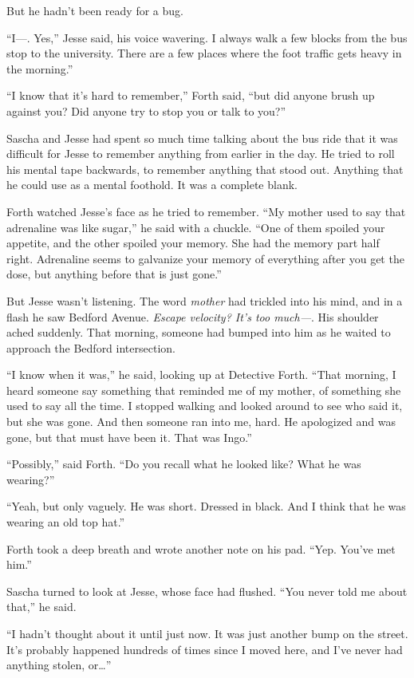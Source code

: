\documentclass[12pt]{book}
\begin{document}
But he hadn't been ready for a bug.

``I---.  Yes,'' Jesse said, his voice wavering.  I always walk a few blocks from the bus stop to the university.  There are a few places where the foot traffic gets heavy in the morning.''

``I know that it's hard to remember,'' Forth said, ``but did anyone brush up against you?  Did anyone try to stop you or talk to you?''

Sascha and Jesse had spent so much time talking about the bus ride that it was difficult for Jesse to remember anything from earlier in the day.  He tried to roll his mental tape backwards, to remember anything that stood out.  Anything that he could use as a mental foothold.  It was a complete blank.

Forth watched Jesse's face as he tried to remember.  ``My mother used to say that adrenaline was like sugar,'' he said with a chuckle.  ``One of them spoiled your appetite, and the other spoiled your memory.  She had the memory part half right.  Adrenaline seems to galvanize your memory of everything after you get the dose, but anything before that is just gone.''

But Jesse wasn't listening.  The word \emph{mother} had trickled into his mind, and in a flash he saw Bedford Avenue.  \emph{Escape velocity?  It's too much---}.  His shoulder ached suddenly.  That morning, someone had bumped into him as he waited to approach the Bedford intersection.

``I know when it was,'' he said, looking up at Detective Forth.  ``That morning, I heard someone say something that reminded me of my mother, of something she used to say all the time.  I stopped walking and looked around to see who said it, but she was gone.  And then someone ran into me, hard.  He apologized and was gone, but that must have been it.  That was Ingo.''

``Possibly,'' said Forth.  ``Do you recall what he looked like?  What he was wearing?''

``Yeah, but only vaguely.  He was short.  Dressed in black.  And I think that he was wearing an old top hat.''

Forth took a deep breath and wrote another note on his pad.  ``Yep.  You've met him.''

Sascha turned to look at Jesse, whose face had flushed.  ``You never told me about that,'' he said.

``I hadn't thought about it until just now.  It was just another bump on the street.  It's probably happened hundreds of times since I moved here, and I've never had anything stolen, or\dots''
\end{document}
